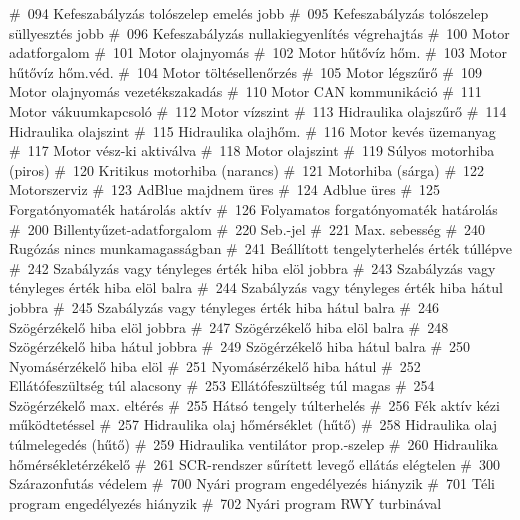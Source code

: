 	{\#\ 094 Kefeszabályzás tolószelep emelés jobb}
	{\#\ 095 Kefeszabályzás tolószelep süllyesztés jobb}
	{\#\ 096 Kefeszabályzás nullakiegyenlítés végrehajtás}
	{\#\ 100 Motor adatforgalom}
	{\#\ 101 Motor olajnyomás}
	{\#\ 102 Motor hűtővíz hőm.}
	{\#\ 103 Motor hűtővíz hőm.véd.}
	{\#\ 104 Motor töltésellenőrzés}
	{\#\ 105 Motor légszűrő}
	{\#\ 109 Motor olajnyomás vezetékszakadás}
	{\#\ 110 Motor CAN kommunikáció}
	{\#\ 111 Motor vákuumkapcsoló}
	{\#\ 112 Motor vízszint}
	{\#\ 113 Hidraulika olajszűrő}
	{\#\ 114 Hidraulika olajszint}
	{\#\ 115 Hidraulika olajhőm.}
	{\#\ 116 Motor kevés üzemanyag}
	{\#\ 117 Motor vész-ki aktiválva}
	{\#\ 118 Motor olajszint}
	{\#\ 119 Súlyos motorhiba (piros)}
	{\#\ 120 Kritikus motorhiba (narancs)}
	{\#\ 121 Motorhiba (sárga)}
	{\#\ 122 Motorszerviz}
	{\#\ 123 AdBlue majdnem üres}
	{\#\ 124 Adblue üres}
	{\#\ 125 Forgatónyomaték határolás aktív}
	{\#\ 126 Folyamatos forgatónyomaték határolás}
	{\#\ 200 Billentyűzet-adatforgalom}
	{\#\ 220 Seb.-jel}
	{\#\ 221 Max. sebesség}
	{\#\ 240 Rugózás nincs munkamagasságban}
	{\#\ 241 Beállított tengelyterhelés érték túllépve}
	{\#\ 242 Szabályzás vagy tényleges érték hiba elöl jobbra}
	{\#\ 243 Szabályzás vagy tényleges érték hiba elöl balra}
	{\#\ 244 Szabályzás vagy tényleges érték hiba hátul jobbra}
	{\#\ 245 Szabályzás vagy tényleges érték hiba hátul balra}
	{\#\ 246 Szögérzékelő hiba elöl jobbra}
	{\#\ 247 Szögérzékelő hiba elöl balra}
	{\#\ 248 Szögérzékelő hiba hátul jobbra}
	{\#\ 249 Szögérzékelő hiba hátul balra}
	{\#\ 250 Nyomásérzékelő hiba elöl}
	{\#\ 251 Nyomásérzékelő hiba hátul}
	{\#\ 252 Ellátófeszültség túl alacsony}
	{\#\ 253 Ellátófeszültség túl magas}
	{\#\ 254 Szögérzékelő max. eltérés}
	{\#\ 255 Hátsó tengely túlterhelés}
	{\#\ 256 Fék aktív kézi működtetéssel}
	{\#\ 257 Hidraulika olaj hőmérséklet (hűtő)}
	{\#\ 258 Hidraulika olaj túlmelegedés (hűtő)}
	{\#\ 259 Hidraulika ventilátor prop.-szelep}
	{\#\ 260 Hidraulika hőmérsékletérzékelő}
	{\#\ 261 SCR-rendszer sűrített levegő ellátás elégtelen}
	{\#\ 300 Szárazonfutás védelem}
	{\#\ 700 Nyári program engedélyezés hiányzik}
	{\#\ 701 Téli program engedélyezés hiányzik}
	{\#\ 702 Nyári program RWY turbinával}
\stopsetups



\stopenvironment